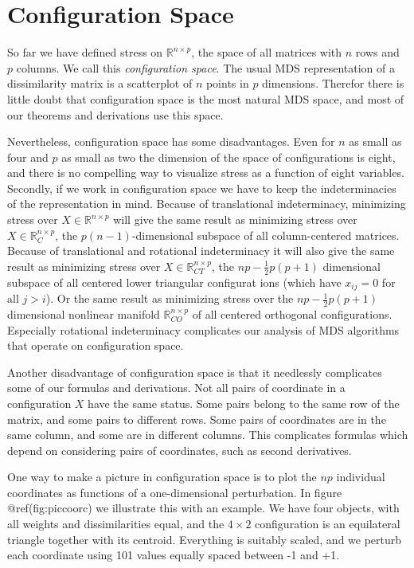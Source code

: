 \documentclass[
  12pt,
  letterpaper,
  DIV=11,
  numbers=noendperiod]{scrreprt}
\theoremstyle{remark}
\begin{document}
\section{Configuration Space}\label{propconfspace}

So far we have defined stress on \(\mathbb{R}^{n\times p}\), the space
of all matrices with \(n\) rows and \(p\) columns. We call this
\emph{configuration space}. The usual MDS representation of a
dissimilarity matrix is a scatterplot of \(n\) points in \(p\)
dimensions. Therefor there is little doubt that configuration space is
the most natural MDS space, and most of our theorems and derivations use
this space.

Nevertheless, configuration space has some disadvantages. Even for \(n\)
as small as four and \(p\) as small as two the dimension of the space of
configurations is eight, and there is no compelling way to visualize
stress as a function of eight variables. Secondly, if we work in
configuration space we have to keep the indeterminacies of the
representation in mind. Because of translational indeterminacy,
minimizing stress over \(X\in\mathbb{R}^{n\times p}\) will give the same
result as minimizing stress over \(X\in\mathbb{R}_C^{n\times p}\), the
\(p(n-1)\)-dimensional subspace of all column-centered matrices. Because
of translational and rotational indeterminacy it will also give the same
result as minimizing stress over \(X\in\mathbb{R}_{CT}^{n\times p}\),
the \(np-\frac12p(p+1)\) dimensional subspace of all centered lower
triangular configurat ions (which have \(x_{ij}=0\) for all \(j>i\)). Or
the same result as minimizing stress over the \(np-\frac12p(p+1)\)
dimensional nonlinear manifold \(\mathbb{R}_{CO}^{n\times p}\) of all
centered orthogonal configurations. Especially rotational indeterminacy
complicates our analysis of MDS algorithms that operate on configuration
space.

Another disadvantage of configuration space is that it needlessly
complicates some of our formulas and derivations. Not all pairs of
coordinate in a configuration \(X\) have the same status. Some pairs
belong to the same row of the matrix, and some pairs to different rows.
Some pairs of coordinates are in the same column, and some are in
different columns. This complicates formulas which depend on considering
pairs of coordinates, such as second derivatives.

One way to make a picture in configuration space is to plot the \(np\)
individual coordinates as functions of a one-dimensional perturbation.
In figure @ref(fig:piccoorc) we illustrate this with an example. We have
four objects, with all weights and dissimilarities equal, and the
\(4\times 2\) configuration is an equilateral triangle together with its
centroid. Everything is suitably scaled, and we perturb each coordinate
using 101 values equally spaced between -1 and +1.
\end{document}
